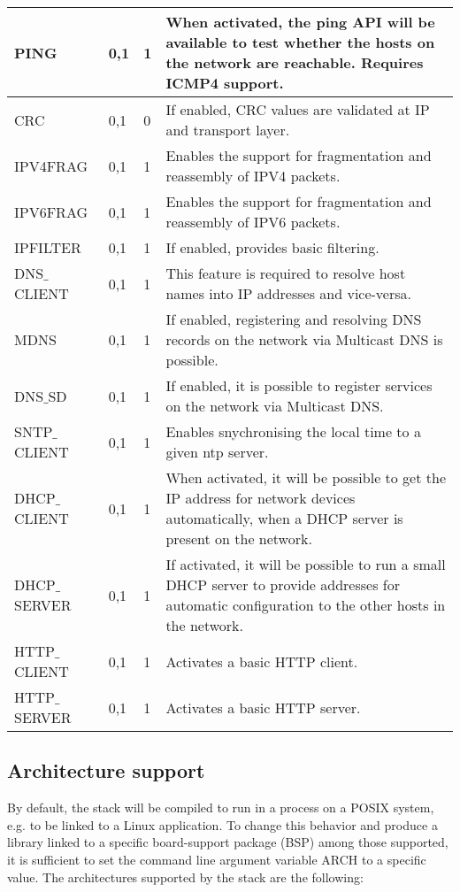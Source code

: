 \begin{longtable}{ | l | l | l | p{5cm} | }
PING&
0,1&
1&
When activated, the ping API will be available to test whether the hosts on the network are reachable.
Requires ICMP4 support.
\\ \hline

CRC&
0,1&
0&
If enabled, CRC values are validated at IP and transport layer.
\\ \hline

IPV4FRAG&
0,1&
1&
Enables the support for fragmentation and reassembly of IPV4 packets.
\\ \hline

IPV6FRAG&
0,1&
1&
Enables the support for fragmentation and reassembly of IPV6 packets.
\\ \hline

IPFILTER&
0,1&
1&
If enabled, provides basic filtering.
\\ \hline

DNS$\_$CLIENT&
0,1&
1&
This feature is required to resolve host names into IP addresses and vice-versa.
\\ \hline

MDNS&
0,1&
1&
If enabled, registering and resolving DNS records on the network via Multicast DNS is possible.
\\ \hline

DNS$\_$SD&
0,1&
1&
If enabled, it is possible to register services on the network via Multicast DNS.
\\ \hline

SNTP$\_$CLIENT&
0,1&
1&
Enables snychronising the local time to a given ntp server.
\\ \hline

DHCP$\_$CLIENT&
0,1&
1&
When activated, it will be possible to get the IP address for network devices automatically, when a DHCP
server is present on the network.
\\ \hline

DHCP$\_$SERVER&
0,1&
1&
If activated, it will be possible to run a small DHCP server to provide addresses for automatic configuration
to the other hosts in the network.
\\ \hline

HTTP$\_$CLIENT&
0,1&
1&
Activates a basic HTTP client.
\\ \hline

HTTP$\_$SERVER&
0,1&
1&
Activates a basic HTTP server.
\\ \hline

\end{longtable}

\subsection{Architecture support}
By default, the stack will be compiled to run in a process on a POSIX
system, e.g. to be linked to a Linux application. To change this behavior
and produce a library linked to a specific board-support package (BSP)
among those supported, it is sufficient to set the command line argument
variable ARCH to a specific value. The architectures supported by the stack
are the following:


